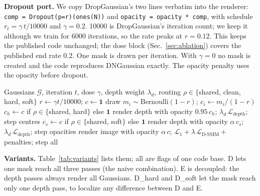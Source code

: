 \documentclass[conference]{IEEEtran}
\begin{document}
\textbf{Dropout port.} We copy DropGaussian's two lines verbatim into the renderer: \texttt{comp = Dropout(p=r)(ones(N))} and \texttt{opacity = opacity * comp}, with schedule $r_t=\gamma\,t/10000$ and $\gamma=0.2$. 10000 is DropGaussian's iteration count; we keep it although we train for 6000 iterations, so the rate peaks at $r=0.12$. This keeps the published code unchanged; the dose block (Sec.~\ref{sec:ablation}) covers the published end rate $0.2$. One mask is drawn per iteration. With $\gamma=0$ no mask is created and the code reproduces DNGaussian exactly. The opacity penalty uses the opacity before dropout.

\begin{algorithm}[t]
\caption{One training iteration with mask routing}\label{alg:iter}
\small
\begin{algorithmic}[1]
\Require Gaussians $\mathcal G$, iteration $t$, dose $\gamma$, depth weight $\lambda_d$, routing $\rho\in\{$shared, clean, hard, soft$\}$
\State $r\gets\gamma t/10000$;\; $c\gets\mathbf 1$
 draw $m_i\sim\mathrm{Bernoulli}(1-r)$;\; $c_i\gets m_i/(1-r)$ \EndIf
{}
  \State $c_h\gets c$ if $\rho\in\{$shared, hard$\}$ else $\mathbf 1$
  \State render depth with opacity $0.95\,c_h$; $\lambda_d\,\mathcal L_{\text{depth}}$; step centres
    \State $c_s\gets c$ if $\rho\in\{$shared, soft$\}$ else $\mathbf 1$
    \State render depth with opacity $\alpha\,c_s$; $\lambda_d\,\mathcal L_{\text{depth}}$; step opacities
  \EndIf
\EndIf
\State render image with opacity $\alpha\,c$; $\mathcal L_1+\lambda\,\mathcal L_{\text{D-SSIM}}+$ penalties; step all
\end{algorithmic}
\end{algorithm}

\textbf{Variants.} Table~\ref{tab:variants} lists them; all are flags of one code base. D lets one mask reach all three passes (the naive combination). E is decoupled: the depth passes always render all Gaussians. D\_hard and D\_soft let the mask reach only one depth pass, to localize any difference between D and E.
\end{document}
